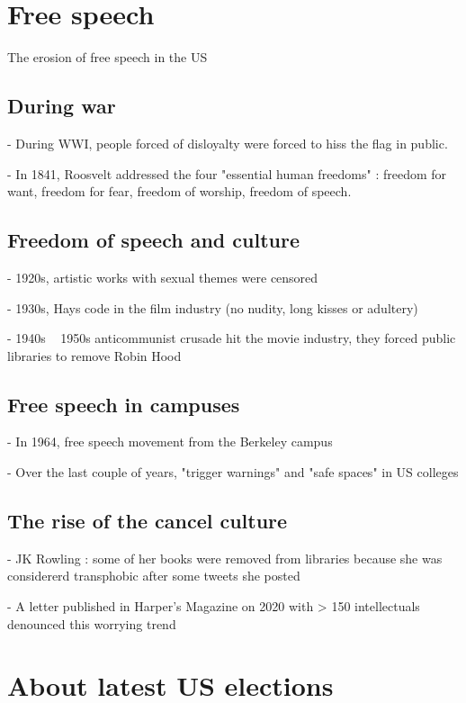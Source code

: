 \documentclass[10pt]{article}
\date{}
\begin{document}
    \section*{Free speech}

The erosion of free speech in the US

\subsection*{During war}

- During WWI, people forced of disloyalty were forced to hiss the flag in 
public.

- In 1841, Roosvelt addressed the four "essential human freedoms" : freedom for
 want, freedom for fear, freedom of worship, freedom of speech.

\subsection*{Freedom of speech and culture}

- 1920s, artistic works with sexual themes were censored

- 1930s, Hays code in the film industry (no nudity, long kisses or adultery)

- 1940s ~ 1950s anticommunist crusade hit the movie industry, they forced 
public libraries to remove Robin Hood

\subsection*{Free speech in campuses}

- In 1964, free speech movement from the Berkeley campus

- Over the last couple of years, "trigger warnings" and "safe spaces" in US 
colleges

\subsection*{The rise of the cancel culture}

- JK Rowling : some of her books were removed from libraries because she was 
considererd transphobic after some tweets she posted

- A letter published in Harper's Magazine on 2020 with > 150 intellectuals 
denounced this worrying trend



\newpage

\section*{About latest US elections}
\end{document}
